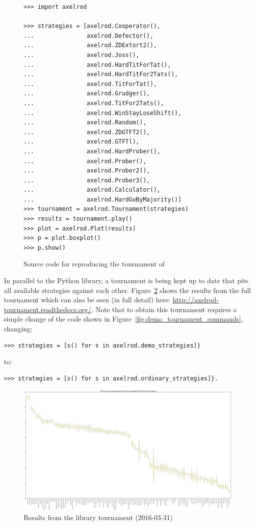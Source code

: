 \documentclass{jors}
\begin{document}
\begin{figure}[!hbtp]
    \begin{verbatim}
>>> import axelrod

>>> strategies = [axelrod.Cooperator(),
...               axelrod.Defector(),
...               axelrod.ZDExtort2(),
...               axelrod.Joss(),
...               axelrod.HardTitForTat(),
...               axelrod.HardTitFor2Tats(),
...               axelrod.TitForTat(),
...               axelrod.Grudger(),
...               axelrod.TitFor2Tats(),
...               axelrod.WinStayLoseShift(),
...               axelrod.Random(),
...               axelrod.ZDGTFT2(),
...               axelrod.GTFT(),
...               axelrod.HardProber(),
...               axelrod.Prober(),
...               axelrod.Prober2(),
...               axelrod.Prober3(),
...               axelrod.Calculator(),
...               axelrod.HardGoByMajority()]
>>> tournament = axelrod.Tournament(strategies)
>>> results = tournament.play()
>>> plot = axelrod.Plot(results)
>>> p = plot.boxplot()
>>> p.show()
    \end{verbatim}
    \caption{Source code for reproducing the tournament of \cite{Stewart2012}}
    \label{fig:stewart-code}
\end{figure}

In parallel to the Python library, a tournament is being kept up to date that
pits all available strategies against each other. Figure~\ref{fig:tournament}
shows the results from the full tournament which can also be seen (in full
detail) here: \url{http://axelrod-tournament.readthedocs.org/}. Note that to
obtain this tournament requires a simple change of the code shown in
Figure~\ref{fig:demo_tournament_commands}, changing:

\begin{verbatim}
>>> strategies = [s() for s in axelrod.demo_strategies]}
\end{verbatim}

to:

\begin{verbatim}
>>> strategies = [s() for s in axelrod.ordinary_strategies]}.
\end{verbatim}

\begin{figure}[!hbtp]
    \centering
    \includegraphics[width=.75\textwidth]{tournament.pdf}
    \caption{Results from the library tournament (2016-03-31)}
    \label{fig:tournament}
\end{figure}
\end{document}
